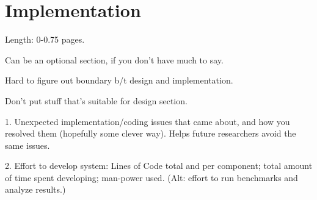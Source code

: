 \section{Implementation}
\label{implementation}

Length: 0-0.75 pages.

Can be an optional section, if you don't have much to say.

Hard to figure out boundary b/t design and implementation.

Don't put stuff that's suitable for design section.

1. Unexpected implementation/coding issues that came about, and
how you resolved them (hopefully some clever way).  Helps future
researchers avoid the same issues.

2. Effort to develop system: Lines of Code total and per
component; total amount of time spent developing; man-power
used.  (Alt: effort to run benchmarks and analyze results.)


